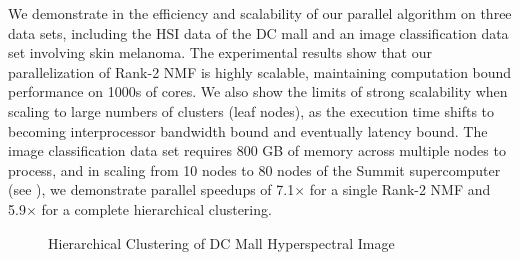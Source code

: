 We demonstrate in  the efficiency and scalability of our parallel algorithm on three data sets, including the HSI data of the DC mall and an image classification data set involving skin melanoma.
The experimental results show that our parallelization of Rank-2 NMF is highly scalable, maintaining computation bound performance on 1000s of cores.
We also show the limits of strong scalability when scaling to large numbers of clusters (leaf nodes), as the execution time shifts to becoming interprocessor bandwidth bound and eventually latency bound.
The image classification data set requires 800 GB of memory across multiple nodes to process, and in scaling from 10 nodes to 80 nodes of the Summit supercomputer (see ), we demonstrate parallel speedups of 7.1$\times$ for a single Rank-2 NMF and 5.9$\times$ for a complete hierarchical clustering.

\begin{figure}

\caption{Hierarchical Clustering of DC Mall Hyperspectral Image}
\label{fig:dc}
\end{figure}
